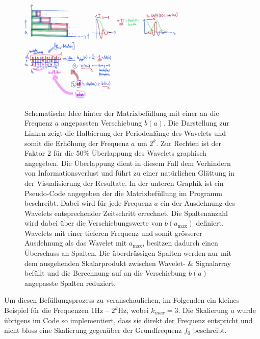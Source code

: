 \begin{figure}
	\centering
	\includegraphics[width=0.3\textwidth]{papers/wavelets/images/16-1_filterbankFillUp_1.png}
	\includegraphics[width=0.4\textwidth]{papers/wavelets/images/16-2_filterbankFillUp_2.png}
	\includegraphics[width=0.4\textwidth]{papers/wavelets/images/16-3_filterbankFillUp_3.png}
	\caption{Schematische Idee hinter der Matrixbefüllung mit einer an die Frequenz $a$ angepassten Verschiebung $b(a)$. Die Darstellung zur Linken zeigt die Halbierung der Periodenlänge des Wavelets und somit die Erhöhung der Frequenz $a$ um $2^k$. Zur Rechten ist der Faktor 2 für die 50\% Überlappung des Wavelets graphisch angegeben. Die Überlappung dient in diesem Fall dem Verhindern von Informationsverlust und führt zu einer natürlichen Glättung in der Visualisierung der Resultate. In der unteren Graphik ist ein Pseudo-Code angegeben der die Matrixbefüllung im Programm beschreibt. Dabei wird für jede Frequenz $a$ ein der Ausdehnung des Wavelets entsprechender Zeitschritt errechnet. Die Spaltenanzahl wird dabei über die Verschiebungswerte von $b(a_\text{max})$ definiert. 
	Wavelets mit einer tieferen Frequenz und somit grösserer Ausdehnung als das Wavelet mit $a_\text{max}$, besitzen dadurch einen Überschuss an Spalten. Die überdrüssigen Spalten werden nur mit dem ausgehenden Skalarprodukt zwischen Wavelet- \& Signalarray befüllt und die Berechnung auf an die Verschiebung $b(a)$ angepasste Spalten reduziert.}
	\label{wavelet:fig:filterbankFillUp}
\end{figure}

Um diesen Befüllungsprozess zu veranschaulichen, im Folgenden ein kleines Beispiel für die Frequenzen 1Hz – $2^k$Hz, wobei $k_{max} = 3$. Die Skalierung $a$ wurde übrigens im Code so implementiert, dass sie direkt der Frequenz entspricht und nicht bloss eine Skalierung gegenüber der Grundfrequenz $f_0$ beschreibt. 

